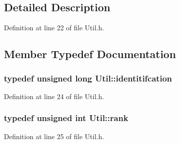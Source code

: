 \subsection{Detailed Description}


Definition at line 22 of file Util.\-h.



\subsection{Member Typedef Documentation}
\hypertarget{class_util_ad17d458d9344b10bba64347e514d6d71}{
\subsubsection[{identitifcation}]{\setlength{\rightskip}{0pt plus 5cm}typedef unsigned long {\bf Util\-::identitifcation}}}\label{class_util_ad17d458d9344b10bba64347e514d6d71}


Definition at line 24 of file Util.\-h.

\hypertarget{class_util_a2a402b3a3a889d699bb3a1a87cbe6d1e}{
\subsubsection[{rank}]{\setlength{\rightskip}{0pt plus 5cm}typedef unsigned int {\bf Util\-::rank}}}\label{class_util_a2a402b3a3a889d699bb3a1a87cbe6d1e}


Definition at line 25 of file Util.\-h.



